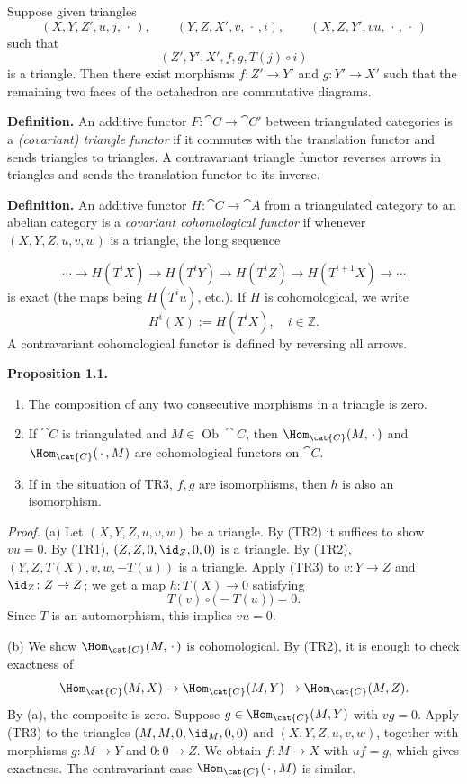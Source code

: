\setcounter{page}{22}
Suppose given triangles
\[
(X,Y,Z',u,j,\,\cdot\,),\qquad
(Y,Z,X',v,\,\cdot\,,i),\qquad
(X,Z,Y',vu,\,\cdot\,,\,\cdot\,)
\]
such that
\[
(Z',Y',X',f,g,T(j)\circ i)
\]
is a triangle. Then there exist morphisms \(f\colon Z'\to Y'\) and \(g\colon Y'\to X'\) such that the remaining two faces of the octahedron are commutative diagrams.

\medskip
\textbf{Definition.}
An additive functor \(F\colon\cat{C}\to\cat{C}'\) between triangulated categories is a \textit{(covariant) triangle functor} if it commutes with the translation functor and sends triangles to triangles.
A contravariant triangle functor reverses arrows in triangles and sends the translation functor to its inverse.

\medskip
\textbf{Definition.}
An additive functor \(H\colon\cat{C}\to\cat{A}\) from a triangulated category to an abelian category is a \textit{covariant cohomological functor} if whenever \((X,Y,Z,u,v,w)\) is a triangle, the long sequence

\setcounter{page}{23}
\[
\cdots \to H(T^i X)\to H(T^i Y)\to H(T^i Z)\to H(T^{i+1}X)\to\cdots
\]
is exact (the maps being \(H(T^i u)\), etc.).
If \(H\) is cohomological, we write
\[
H^i(X) := H(T^i X),\quad i\in\mathbb{Z}.
\]
A contravariant cohomological functor is defined by reversing all arrows.

\medskip
\textbf{Proposition 1.1.}
\begin{enumerate}
\item[(a)] The composition of any two consecutive morphisms in a triangle is zero.
\item[(b)] If \(\cat{C}\) is triangulated and \(M\in\operatorname{Ob}\cat{C}\), then
\(\Hom_{\cat{C}}(M,\,\cdot\,)\) and \(\Hom_{\cat{C}}(\,\cdot\,,M)\)
are cohomological functors on \(\cat{C}\).
\item[(c)] If in the situation of \(\text{TR3}\), \(f,g\) are isomorphisms, then \(h\) is also an isomorphism.
\end{enumerate}

\textit{Proof.}
(a) Let \((X,Y,Z,u,v,w)\) be a triangle. By (TR2) it suffices to show \(vu=0\).
By (TR1), \((Z,Z,0,\id_Z,0,0)\) is a triangle.
By (TR2), \((Y,Z,T(X),v,w,-T(u))\) is a triangle.
Apply (TR3) to \(v\colon Y\to Z\) and \(\id_Z\colon Z\to Z\); we get a map \(h\colon T(X)\to 0\) satisfying
\[
T(v)\circ\big(-T(u)\big)=0.
\]
Since \(T\) is an automorphism, this implies \(vu=0\).

\setcounter{page}{24}

(b) We show \(\Hom_{\cat{C}}(M,\,\cdot\,)\) is cohomological. By (TR2), it is enough to check exactness of
\[
\Hom_{\cat{C}}(M,X)\to\Hom_{\cat{C}}(M,Y)\to\Hom_{\cat{C}}(M,Z).
\]
By (a), the composite is zero.
Suppose \(g\in\Hom_{\cat{C}}(M,Y)\) with \(vg=0\).
Apply (TR3) to the triangles \((M,M,0,\id_M,0,0)\) and \((X,Y,Z,u,v,w)\), together with morphisms \(g\colon M\to Y\) and \(0\colon 0\to Z\).
We obtain \(f\colon M\to X\) with \(uf=g\), which gives exactness.
The contravariant case \(\Hom_{\cat{C}}(\,\cdot\,,M)\) is similar.

